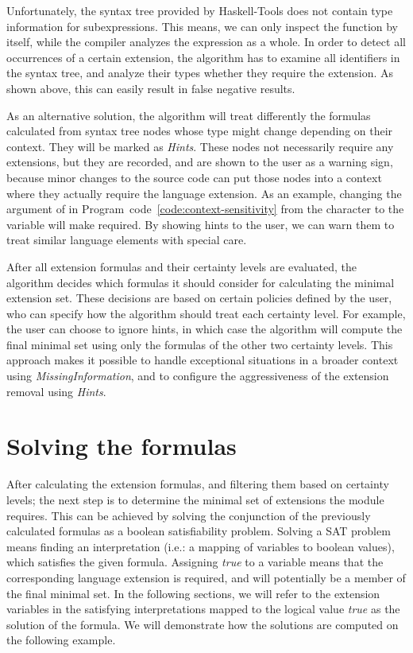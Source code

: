 \documentclass[main.tex]{subfiles}
\begin{document}
	\noindent
	Unfortunately, the syntax tree provided by Haskell-Tools does not contain type information for subexpressions. This means, we can only inspect the function by itself, while the compiler analyzes the expression as a whole. In order to detect all occurrences of a certain extension, the algorithm has to examine all identifiers in the syntax tree, and analyze their types whether they require the extension. As shown above, this can easily result in false negative results.
	
	As an alternative solution, the algorithm will treat differently the formulas calculated from syntax tree nodes whose type might change depending on their context. They will be marked as \emph{Hints}. These nodes not necessarily require any extensions, but they are recorded, and are shown to the user as a warning sign, because minor changes to the source code can put those nodes into a context where they actually require the language extension. As an example, changing the argument of  in Program~code~\ref{code:context-sensitivity} from the character  to the variable  will make  required. By showing hints to the user, we can warn them to treat similar language elements with special care.
	
	After all extension formulas and their certainty levels are evaluated, the algorithm decides which formulas it should consider for calculating the minimal extension set. These decisions are based on certain policies defined by the user, who can specify how the algorithm should treat each certainty level. For example, the user can choose to ignore hints, in which case the algorithm will compute the final minimal set using only the formulas of the other two certainty levels. This approach makes it possible to handle exceptional situations in a broader context using \emph{MissingInformation}, and to configure the aggressiveness of the extension removal using \emph{Hints}.
	
	\section{Solving the formulas} \label{sat-solver}
	
	After calculating the extension formulas, and filtering them based on certainty levels; the next step is to determine the minimal set of extensions the module requires. This can be achieved by solving the conjunction of the previously calculated formulas as a boolean satisfiability problem. Solving a SAT problem means finding an interpretation (i.e.: a mapping of variables to boolean values), which satisfies the given formula. Assigning \textit{true} to a variable means that the corresponding language extension is required, and will potentially be a member of the final minimal set. In the following sections, we will refer to the extension variables in the satisfying interpretations mapped to the logical value \emph{true} as the solution of the formula. We will demonstrate how the solutions are computed on the following example.
	
\end{document}
